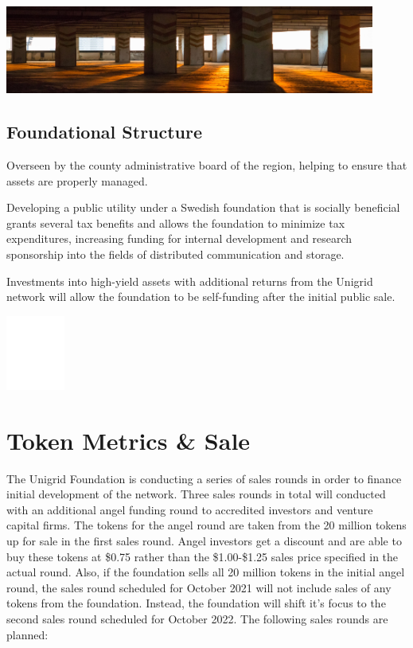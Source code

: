 \documentclass{article}
\begin{document}
\begin{mdframed}[style=textimage]
	\includegraphics[width=345pt]{foundation}
\end{mdframed}
\subsection{Foundational Structure}
Overseen by the county administrative board of the region, helping to ensure that assets are properly managed.

Developing a public utility under a Swedish foundation that is socially beneficial grants several tax benefits and allows the foundation to minimize tax expenditures, increasing funding for internal development and research sponsorship into the fields of distributed communication and storage.

Investments into high-yield assets with additional returns from the Unigrid network will allow the foundation to be self-funding after the initial public sale.
\begin{center}
\includegraphics[width=55pt]{sale-round}
\end{center}
\section{Token Metrics \& Sale}
The Unigrid Foundation is conducting a series of sales rounds in order to finance initial development of the network. Three sales rounds in total will conducted with an additional angel funding round to accredited investors and venture capital firms. The tokens for the angel round are taken from the 20 million tokens up for sale in the first sales round. Angel investors get a discount and are able to buy these tokens at \$0.75 rather than the \$1.00-\$1.25 sales price specified in the actual round. Also, if the foundation sells all 20 million tokens in the initial angel round, the sales round scheduled for October 2021 will not include sales of any tokens from the foundation. Instead, the foundation will shift it's focus to the second sales round scheduled for October 2022. The following sales rounds are planned:
\end{document}
